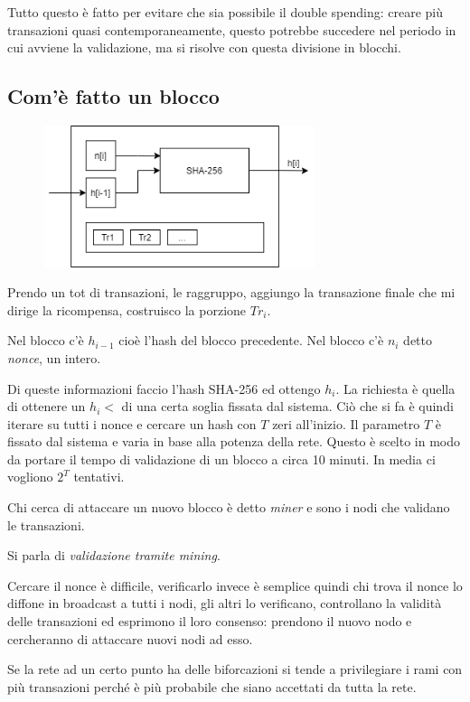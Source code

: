 Tutto questo è fatto per evitare che sia possibile il double spending: creare più transazioni quasi contemporaneamente, questo potrebbe succedere nel periodo in cui avviene la validazione, ma si risolve con questa divisione in blocchi.

\subsection{Com'è fatto un blocco}

\begin{figure}[H]
    \centering
    \includegraphics[width=300px]{Bitcoin_1.png}
\end{figure}

Prendo un tot di transazioni, le raggruppo, aggiungo la transazione finale che mi dirige la ricompensa, costruisco la porzione $Tr_{i}$.

Nel blocco c'è $h_{i-1}$ cioè l'hash del blocco precedente. Nel blocco c'è $n_i$ detto \emph{nonce}, un intero.

Di queste informazioni faccio l'hash SHA-256 ed ottengo $h_i$. La richiesta è quella di ottenere un $h_i < $ di una certa soglia fissata dal sistema.
Ciò che si fa è quindi iterare su tutti i nonce e cercare un hash con $T$ zeri all'inizio.
Il parametro $T$ è fissato dal sistema e varia in base alla potenza della rete.
Questo è scelto in modo da portare il tempo di validazione di un blocco a circa 10 minuti.
In media ci vogliono $2^T$ tentativi.

Chi cerca di attaccare un nuovo blocco è detto \emph{miner} e sono i nodi che validano le transazioni.

Si parla di \emph{validazione tramite mining}.

Cercare il nonce è difficile, verificarlo invece è semplice quindi chi trova il nonce lo diffone in broadcast a tutti i nodi, gli altri lo verificano, controllano la validità delle transazioni ed esprimono il loro consenso: prendono il nuovo nodo e cercheranno di attaccare nuovi nodi ad esso.

Se la rete ad un certo punto ha delle biforcazioni si tende a privilegiare i rami con più transazioni perché è più probabile che siano accettati da tutta la rete.

